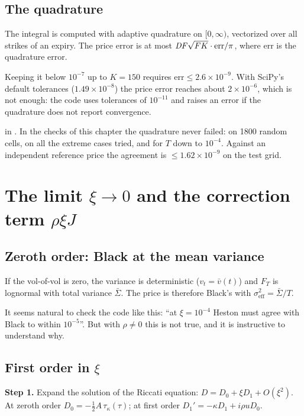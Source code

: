 \subsection{The quadrature}
The integral is computed with adaptive quadrature on $[0,\infty)$, vectorized over all strikes of an expiry. The price
error is at most $\mathit{DF}\sqrt{FK}\cdot\mathrm{err}/\pi$, where $\mathrm{err}$ is the quadrature error.

Keeping it below $10^{-7}$ up to $K=150$ requires $\mathrm{err}\le{2.6\times10^{-9}}$. With SciPy's default
tolerances (${1.49\times10^{-8}}$) the price error reaches about ${2\times10^{-6}}$, which is not enough: the code uses
tolerances of $10^{-11}$ and raises an error if the quadrature does not report convergence.

\begin{progetto}
 in . In the checks of this chapter the quadrature never
failed: on 1800 random cells, on all the extreme cases tried, and for $T$ down to $10^{-4}$. Against an independent
reference price the agreement is $\le{1.62\times10^{-9}}$ on the test grid.
\end{progetto}

\section{\texorpdfstring{The limit $\xi\to0$ and the correction term $\rho\xi J$}{The limit xi -> 0 and the correction term rho xi J}}
\subsection{Zeroth order: Black at the mean variance}
If the vol-of-vol is zero, the variance is deterministic ($v_t=\bar v(t)$) and $F_T$ is lognormal with total variance
$\bar\Sigma$. The price is therefore Black's with $\sigma_{\text{eff}}^2=\bar\Sigma/T$.

It seems natural to check the code like this: ``at $\xi=10^{-4}$ Heston must agree with Black to within $10^{-5}$''.
But with $\rho\ne0$ this is not true, and it is instructive to understand why.

\subsection{\texorpdfstring{First order in $\xi$}{First order in xi}}
\textbf{Step 1.} Expand the solution of the Riccati equation: $D=D_0+\xi D_1+O(\xi^2)$. At zeroth order
$D_0=-\tfrac12A\,\tau_\kappa(\tau)$; at first order $D_1'=-\kappa D_1+i\rho uD_0$.

